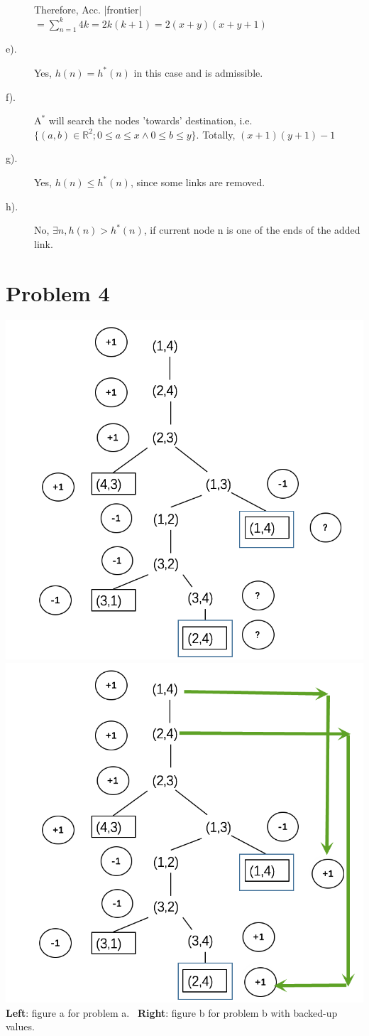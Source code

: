 \documentclass{mcmthesis}
\begin{document}
\begin{description}
	Therefore, Acc. |frontier|$=\sum_{n=1}^{k} 4k=2k(k+1)=2(x+y)(x+y+1)$

	\item[e).] Yes, $h(n)=h^*(n)$ in this case and is admissible.
	\item[f).]  $\text{A}^*$ will search the nodes 'towards' destination, i.e. $\{(a,b)\in \mathbb{R}^2; 0\le a \le x \wedge 0 \le b \le y \}$. Totally, $(x+1)(y+1)-1$
	\item[g).] Yes, $h(n) \le h^*(n)$, since some links are removed.
	\item[h).] No,  $\exists n, h(n) > h^*(n)$, if current node n is  one of the ends of the added link.
	
\end{description}
\section{Problem 4}

\begin{center}
	\includegraphics[width=.45\columnwidth]{fig2} \qquad \includegraphics[width=.45\columnwidth]{fig3} \\
	\textbf{Left}: figure a for problem a. \  \textbf{Right}: figure b for problem b with backed-up values.
\end{center}
\end{document}
